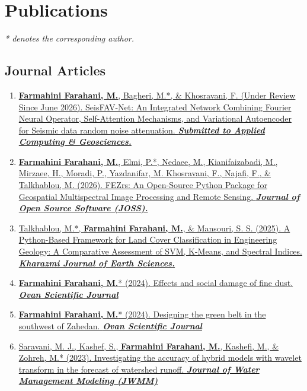 \documentclass[letterpaper,10pt]{article}
\begin{document}
	\section{Publications}
	\begin{justify}
		\small\textit{* denotes the corresponding author.}\normalsize
		\subsection*{Journal Articles}
		\begin{enumerate}[label=\arabic*.,left=0pt,topsep=1pt,partopsep=0pt,itemsep=1pt,parsep=0pt]
			\item \href{https://www.sciencedirect.com/journal/applied-computing-and-geosciences}{\textbf{Farmahini Farahani, M.}, Bagheri, M.*, \& Khosravani, F. (Under Review Since June 2026). SeisFAV-Net: An Integrated Network Combining Fourier Neural Operator, Self-Attention Mechanisms, and Variational Autoencoder for Seismic data random noise attenuation. \textit{\textbf{Submitted to Applied Computing \& Geosciences.}}}
			\item \href{https://github.com/openjournals/joss-reviews/issues/11016}{\textbf{Farmahini Farahani, M.}, Elmi, P.*, Nedaee, M., Kianifaizabadi, M., Mirzaee, H., Moradi, P., Yazdanifar, M. Khosravani, F., Najafi, F., \& Talkhablou, M. (2026). FEZrs: An Open-Source Python Package for Geospatial Multispectral Image Processing and Remote Sensing. \textit{\textbf{Journal of Open Source Software (JOSS).}}}
			\item \href{https://www.researchgate.net/publication/396213857_A_python-based_framework_for_land_cover_classification_in_engineering_geology_A_comparative_assessment_of_SVM_K-means_and_spectral_indices}{Talkhablou, M.*, \textbf{Farmahini Farahani, M.}, \& Mansouri, S. S. (2025). A Python-Based Framework for Land Cover Classification in Engineering Geology: A Comparative Assessment of SVM, K-Means, and Spectral Indices. \textit{\textbf{Kharazmi Journal of Earth Sciences.}}}
			\item \href{https://www.researchgate.net/publication/381203362_Effects_and_social_damage_of_fine_dust}{\textbf{Farmahini Farahani, M.}* (2024). Effects and social damage of fine dust. \textit{\textbf{Ovan Scientific Journal}}}
			\item \href{https://www.researchgate.net/publication/381197940_Designing_the_Green_Belt_in_the_southwest_of_Zahedan}{\textbf{Farmahini Farahani, M.}* (2024). Designing the green belt in the southwest of Zahedan. \textit{\textbf{Ovan Scientific Journal}}}
			\item \href{https://www.researchgate.net/publication/371328175_Investigating_the_Accuracy_of_Hybrid_Models_with_Wavelet_Transform_in_the_Forecast_of_Watershed_Runoff}{Saravani, M. J., Kashef, S., \textbf{Farmahini Farahani, M.}, Kashefi, M., \& Zohreh, M.* (2023). Investigating the accuracy of hybrid models with wavelet transform in the forecast of watershed runoff. \textit{\textbf{Journal of Water Management Modeling (JWMM)}}}
		\end{enumerate}
		

\end{justify}
\end{document}
